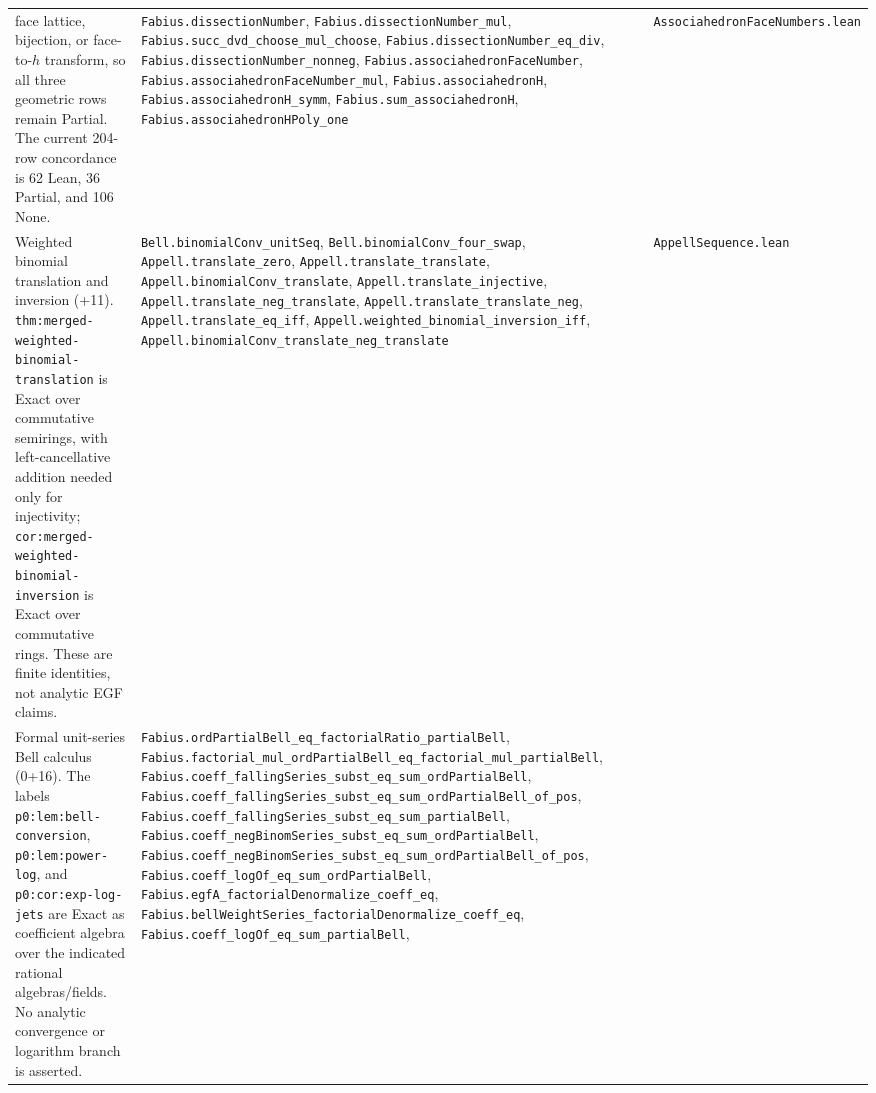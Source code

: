 \documentclass[11pt,oneside]{article}
\theoremstyle{definition}
\theoremstyle{remark}
\begin{document}
\begin{longtable}{@{}p{}p{}p{}@{}}
face lattice, bijection, or face-to-\(h\) transform, so all three geometric
rows remain Partial.  The current 204-row concordance is 62 Lean, 36 Partial,
and 106 None. &
\nolinkurl{Fabius.dissectionNumber},
\nolinkurl{Fabius.dissectionNumber_mul},
\nolinkurl{Fabius.succ_dvd_choose_mul_choose},
\nolinkurl{Fabius.dissectionNumber_eq_div},
\nolinkurl{Fabius.dissectionNumber_nonneg},
\nolinkurl{Fabius.associahedronFaceNumber},
\nolinkurl{Fabius.associahedronFaceNumber_mul},
\nolinkurl{Fabius.associahedronH},
\nolinkurl{Fabius.associahedronH_symm},
\nolinkurl{Fabius.sum_associahedronH},
\nolinkurl{Fabius.associahedronHPoly_one} &
\nolinkurl{AssociahedronFaceNumbers.lean} \\
Weighted binomial translation and inversion (+11).
\nolinkurl{thm:merged-weighted-binomial-translation} is Exact over
commutative semirings, with left-cancellative addition needed only for
injectivity; \nolinkurl{cor:merged-weighted-binomial-inversion} is Exact over
commutative rings.  These are finite identities, not analytic EGF claims. &
\nolinkurl{Bell.binomialConv_unitSeq},
\nolinkurl{Bell.binomialConv_four_swap},
\nolinkurl{Appell.translate_zero},
\nolinkurl{Appell.translate_translate},
\nolinkurl{Appell.binomialConv_translate},
\nolinkurl{Appell.translate_injective},
\nolinkurl{Appell.translate_neg_translate},
\nolinkurl{Appell.translate_translate_neg},
\nolinkurl{Appell.translate_eq_iff},
\nolinkurl{Appell.weighted_binomial_inversion_iff},
\nolinkurl{Appell.binomialConv_translate_neg_translate} &
\nolinkurl{AppellSequence.lean} \\
Formal unit-series Bell calculus (0+16).  The labels
\nolinkurl{p0:lem:bell-conversion}, \nolinkurl{p0:lem:power-log}, and
\nolinkurl{p0:cor:exp-log-jets} are Exact as coefficient algebra over the
indicated rational algebras/fields.  No analytic convergence or logarithm
branch is asserted. &
\nolinkurl{Fabius.ordPartialBell_eq_factorialRatio_partialBell},
\nolinkurl{Fabius.factorial_mul_ordPartialBell_eq_factorial_mul_partialBell},
\nolinkurl{Fabius.coeff_fallingSeries_subst_eq_sum_ordPartialBell},
\nolinkurl{Fabius.coeff_fallingSeries_subst_eq_sum_ordPartialBell_of_pos},
\nolinkurl{Fabius.coeff_fallingSeries_subst_eq_sum_partialBell},
\nolinkurl{Fabius.coeff_negBinomSeries_subst_eq_sum_ordPartialBell},
\nolinkurl{Fabius.coeff_negBinomSeries_subst_eq_sum_ordPartialBell_of_pos},
\nolinkurl{Fabius.coeff_logOf_eq_sum_ordPartialBell},
\nolinkurl{Fabius.egfA_factorialDenormalize_coeff_eq},
\nolinkurl{Fabius.bellWeightSeries_factorialDenormalize_coeff_eq},
\nolinkurl{Fabius.coeff_logOf_eq_sum_partialBell},

\end{longtable}
\end{document}
